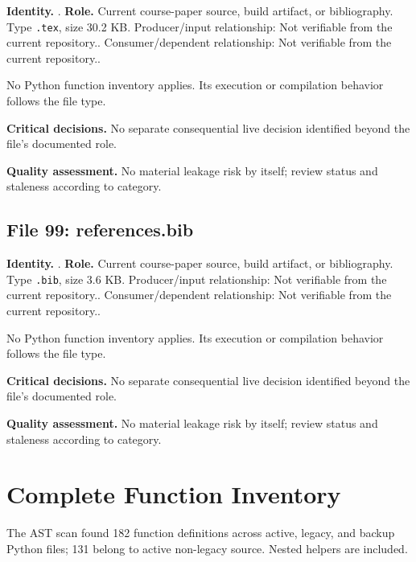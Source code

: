 \documentclass[
  11pt,
  a4paper]{article}
\begin{document}
\textbf{Identity.} . \textbf{Role.} Current
course-paper source, build artifact, or bibliography. Type
\texttt{.tex}, size 30.2 KB. Producer/input relationship: Not verifiable
from the current repository.. Consumer/dependent relationship: Not
verifiable from the current repository..

No Python function inventory applies. Its execution or compilation
behavior follows the file type.

\textbf{Critical decisions.} No separate consequential live decision
identified beyond the file's documented role.

\textbf{Quality assessment.} No material leakage risk by itself; review
status and staleness according to category.

\subsection{File 99: references.bib}\label{file-5234287658189445923}

\textbf{Identity.} . \textbf{Role.} Current
course-paper source, build artifact, or bibliography. Type
\texttt{.bib}, size 3.6 KB. Producer/input relationship: Not verifiable
from the current repository.. Consumer/dependent relationship: Not
verifiable from the current repository..

No Python function inventory applies. Its execution or compilation
behavior follows the file type.

\textbf{Critical decisions.} No separate consequential live decision
identified beyond the file's documented role.

\textbf{Quality assessment.} No material leakage risk by itself; review
status and staleness according to category.

\section{Complete Function Inventory}\label{app-functions}

The AST scan found 182 function definitions across active, legacy, and
backup Python files; 131 belong to active non-legacy source. Nested
helpers are included.
\end{document}
